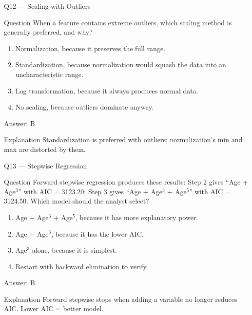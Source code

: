 \documentclass[aspectratio=169,8pt]{beamer}
\begin{document}
	\begin{frame}{Q12 --- Scaling with Outliers}
		\begin{block}{Question}
			When a feature contains extreme outliers, which scaling method is generally preferred, and why?
		\end{block}
		\begin{enumerate}
			\item Normalization, because it preserves the full range.
			\item Standardization, because normalization would squash the data into an uncharacteristic range.
			\item Log transformation, because it always produces normal data.
			\item No scaling, because outliers dominate anyway.
		\end{enumerate}
		\begin{exampleblock}{Answer: B}\end{exampleblock}
		\begin{block}{Explanation}
			Standardization is preferred with outliers; normalization's min and max are distorted by them.
		\end{block}
	\end{frame}
	
	\begin{frame}{Q13 --- Stepwise Regression}
		\begin{block}{Question}
			Forward stepwise regression produces these results: Step 2 gives ``Age + Age$^3$'' with AIC = 3123.20; Step 3 gives ``Age + Age$^3$ + Age$^5$'' with AIC = 3124.50. Which model should the analyst select?
		\end{block}
		\begin{enumerate}
			\item Age + Age$^3$ + Age$^5$, because it has more explanatory power.
			\item Age + Age$^3$, because it has the lower AIC.
			\item Age$^3$ alone, because it is simplest.
			\item Restart with backward elimination to verify.
		\end{enumerate}
		\begin{exampleblock}{Answer: B}\end{exampleblock}
		\begin{block}{Explanation}
			Forward stepwise stops when adding a variable no longer reduces AIC. Lower AIC = better model.
		\end{block}
	\end{frame}
	
\end{document}
